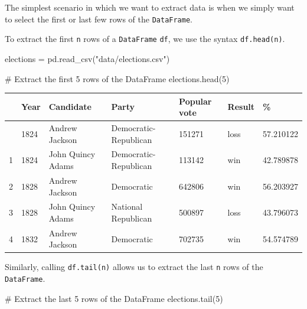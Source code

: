 \documentclass[
  letterpaper,
  DIV=11,
  numbers=noendperiod]{scrreprt}
\newenvironment{Shaded}{\begin{snugshade}}{\end{snugshade}}
\newcommand{\CommentTok}[1]{\textcolor[rgb]{0.37,0.37,0.37}{#1}}
\newcommand{\DecValTok}[1]{\textcolor[rgb]{0.68,0.00,0.00}{#1}}
\newcommand{\NormalTok}[1]{\textcolor[rgb]{0.00,0.23,0.31}{#1}}
\newcommand{\OperatorTok}[1]{\textcolor[rgb]{0.37,0.37,0.37}{#1}}
\newcommand{\StringTok}[1]{\textcolor[rgb]{0.13,0.47,0.30}{#1}}
\begin{document}
The simplest scenario in which we want to extract data is when we simply
want to select the first or last few rows of the \texttt{DataFrame}.

To extract the first \texttt{n} rows of a \texttt{DataFrame}
\texttt{df}, we use the syntax \texttt{df.head(n)}.

\begin{Shaded}
\begin{Highlighting}[]
\NormalTok{elections }\OperatorTok{=}\NormalTok{ pd.read\_csv(}\StringTok{"data/elections.csv"}\NormalTok{)}
\end{Highlighting}
\end{Shaded}

\begin{Shaded}
\begin{Highlighting}[]
\CommentTok{\# Extract the first 5 rows of the DataFrame}
\NormalTok{elections.head(}\DecValTok{5}\NormalTok{)}
\end{Highlighting}
\end{Shaded}

\begin{longtable}[]{@{}lllllll@{}}
\toprule\noalign{}
& Year & Candidate & Party & Popular vote & Result & \% \\
\midrule\noalign{}
\endhead
\bottomrule\noalign{}
\endlastfoot
0 & 1824 & Andrew Jackson & Democratic-Republican & 151271 & loss &
57.210122 \\
1 & 1824 & John Quincy Adams & Democratic-Republican & 113142 & win &
42.789878 \\
2 & 1828 & Andrew Jackson & Democratic & 642806 & win & 56.203927 \\
3 & 1828 & John Quincy Adams & National Republican & 500897 & loss &
43.796073 \\
4 & 1832 & Andrew Jackson & Democratic & 702735 & win & 54.574789 \\
\end{longtable}

Similarly, calling \texttt{df.tail(n)} allows us to extract the last
\texttt{n} rows of the \texttt{DataFrame}.

\begin{Shaded}
\begin{Highlighting}[]
\CommentTok{\# Extract the last 5 rows of the DataFrame}
\NormalTok{elections.tail(}\DecValTok{5}\NormalTok{)}
\end{Highlighting}
\end{Shaded}
\end{document}
